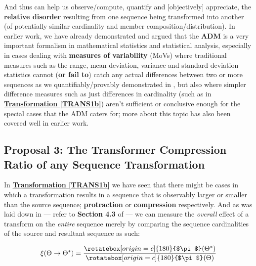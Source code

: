 \documentclass[a4paper, 18pt]{book} %
\newcommand{\invpi}{\rotatebox[origin=c]{180}{$\pi$}}
\begin{document}
\begin{appendices}
And thus can help us observe/compute, quantify and [objectively] appreciate, the \textbf{relative disorder} resulting from one sequence being transformed into another (of potentially similar cardinality and member composition/distribution). In earlier work, we have already demonstrated and argued that the \textbf{ADM} is a very important formalism in mathematical statistics and statistical analysis, especially in cases dealing with \textbf{measures of variability} (MoVs) where traditional measures such as the range, mean deviation, variance and standard deviation statistics cannot (\textbf{or fail to}) catch any actual differences between two or more sequences as we quantifiably/provably demonstrated in \cite{transformatics}, but also where simpler difference measures such as just differences in cardinality (such as in \textbf{\hyperref[TRANS1b]{Transformation \ref{TRANS1b}}}) aren't sufficient or conclusive enough for the special cases that the ADM caters for; more about this topic has also been covered well in earlier work\cite{lutalo_2025_trans_genetics}.


\subsection{Proposal 3: The Transformer Compression Ratio of any Sequence Transformation\cite{transformatics}}
\label{PROP3}

In  \textbf{\hyperref[TRANS1b]{Transformation \ref{TRANS1b}}} we have seen that there might be cases in which a transformation results in a sequence that is observably larger or smaller than the source sequence; \textbf{protraction} or \textbf{compression} respectively. And as was laid down in \cite{transformatics} --- refer to \textbf{Section 4.3} of \cite{transformatics} --- we can measure the \textit{overall} effect of a transform on the \textit{entire} sequence merely by comparing the sequence cardinalities of the source and resultant sequence as such:

\vspace{1em}
\begin{equation}
\label{EQTCRb}
\xi(\Theta \rightarrow \Theta^*) = \frac{\invpi(\Theta^*)}{\invpi(\Theta)}
\end{equation}
\vspace{1em}



\end{appendices}
\end{document}
